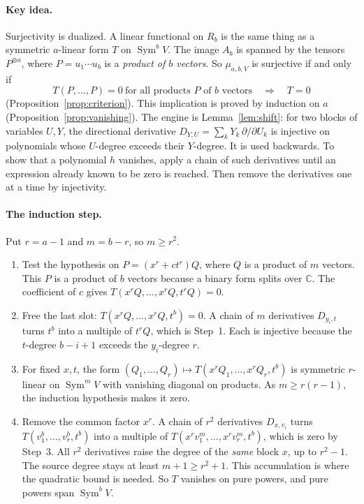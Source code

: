 \documentclass[11pt]{article}
\theoremstyle{remark}
\DeclareMathOperator{\Sym}{Sym}
\newcommand{\C}{\mathbb C}
\newcommand{\D}[2]{D_{#1,#2}}
\begin{document}
\paragraph{Key idea.}
Surjectivity is dualized. A linear functional on $R_b$ is the same thing as
a symmetric $a$-linear form $T$ on $\Sym^bV$. The image $A_b$ is spanned by
the tensors $P^{\otimes a}$, where $P=u_1\cdots u_b$ is a \emph{product of
$b$ vectors}. So $\mu_{a,b,V}$ is surjective if and only if
\[
 T(P,\ldots,P)=0\ \text{for all products $P$ of $b$ vectors}
 \quad\Longrightarrow\quad T=0
\]
(Proposition~\ref{prop:criterion}). This implication is proved by induction
on $a$ (Proposition~\ref{prop:vanishing}). The engine is
Lemma~\ref{lem:shift}: for two blocks of variables $U,Y$, the directional
derivative $\D YU=\sum_kY_k\,\partial/\partial U_k$ is injective on
polynomials whose $U$-degree exceeds their $Y$-degree. It is used
backwards. To show that a polynomial $h$ vanishes, apply a chain of such
derivatives until an expression already known to be zero is reached. Then
remove the derivatives one at a time by injectivity.

\paragraph{The induction step.}
Put $r=a-1$ and $m=b-r$, so $m\ge r^2$.
\begin{enumerate}[label=\textbf{Step \arabic*.},leftmargin=4.2em]
\item Test the hypothesis on $P=(x^r+ct^r)Q$, where $Q$ is a product of $m$
 vectors. This $P$ is a product of $b$ vectors because a binary form
 splits over $\C$. The coefficient of $c$ gives
 $T(x^rQ,\ldots,x^rQ,t^rQ)=0$.
\item Free the last slot: $T(x^rQ,\ldots,x^rQ,t^b)=0$. A chain of $m$
 derivatives $\D{y_i}{t}$ turns $t^b$ into a multiple of $t^rQ$, which is
 Step~1. Each is injective because the $t$-degree $b-i+1$ exceeds the
 $y_i$-degree $r$.
\item For fixed $x,t$, the form
 $(Q_1,\ldots,Q_r)\mapsto T(x^rQ_1,\ldots,x^rQ_r,t^b)$ is symmetric
 $r$-linear on $\Sym^mV$ with vanishing diagonal on products. As
 $m\ge r(r-1)$, the induction hypothesis makes it zero.
\item Remove the common factor $x^r$. A chain of $r^2$ derivatives
 $\D{x}{v_i}$ turns $T(v_1^b,\ldots,v_r^b,t^b)$ into a multiple of
 $T(x^rv_1^m,\ldots,x^rv_r^m,t^b)$, which is zero by Step~3. All $r^2$
 derivatives raise the degree of the \emph{same} block $x$, up to
 $r^2-1$. The source degree stays at least $m+1\ge r^2+1$. This
 accumulation is where the quadratic bound is needed. So $T$ vanishes on
 pure powers, and pure powers span $\Sym^bV$.
\end{enumerate}
\end{document}
